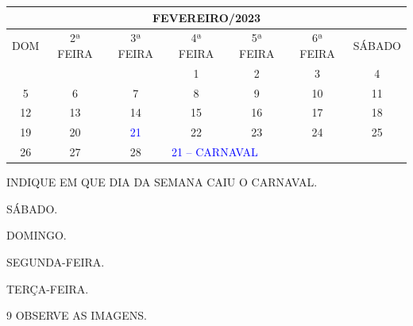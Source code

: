 \begin{table}[H]\footnotesize
\centering
\begin{tabular}{|ccccccc|}
\hline
\multicolumn{7}{|c|}{FEVEREIRO/2023} \\ \hline
\multicolumn{1}{|c|}{DOM} & \multicolumn{1}{c|}{2ª FEIRA} & \multicolumn{1}{c|}{3ª FEIRA} & \multicolumn{1}{c|}{4ª FEIRA} & \multicolumn{1}{c|}{5ª FEIRA} & \multicolumn{1}{c|}{6ª FEIRA} & SÁBADO \\ \hline
\multicolumn{1}{|c|}{} & \multicolumn{1}{c|}{} & \multicolumn{1}{c|}{} & \multicolumn{1}{c|}{1} & \multicolumn{1}{c|}{2} & \multicolumn{1}{c|}{3} & 4 \\ \hline
\multicolumn{1}{|c|}{5} & \multicolumn{1}{c|}{6} & \multicolumn{1}{c|}{7} & \multicolumn{1}{c|}{8} & \multicolumn{1}{c|}{9} & \multicolumn{1}{c|}{10} & 11 \\ \hline
\multicolumn{1}{|c|}{12} & \multicolumn{1}{c|}{13} & \multicolumn{1}{c|}{14} & \multicolumn{1}{c|}{15} & \multicolumn{1}{c|}{16} & \multicolumn{1}{c|}{17} & 18 \\ \hline
\multicolumn{1}{|c|}{19} & \multicolumn{1}{c|}{20} & \multicolumn{1}{c|}{\textcolor{blue}{21}} & \multicolumn{1}{c|}{22} & \multicolumn{1}{c|}{23} & \multicolumn{1}{c|}{24} & 25 \\ \hline
\multicolumn{1}{|c|}{26} & \multicolumn{1}{c|}{27} & \multicolumn{1}{c|}{28} & \multicolumn{4}{l|}{\textcolor{blue}{21 -- CARNAVAL}} \\ \hline
\end{tabular}\bigskip
\end{table}

INDIQUE EM QUE DIA DA SEMANA CAIU O CARNAVAL.

\begin{escolha}
\item SÁBADO.

\item DOMINGO.

\item SEGUNDA-FEIRA.

\item TERÇA-FEIRA.
\end{escolha}

\num{9} OBSERVE AS IMAGENS.
\enlargethispage{4\baselineskip}


